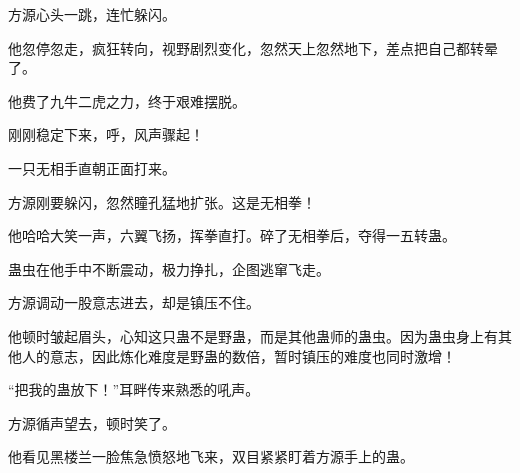 \begin{this_body}
方源心头一跳，连忙躲闪。

他忽停忽走，疯狂转向，视野剧烈变化，忽然天上忽然地下，差点把自己都转晕了。

他费了九牛二虎之力，终于艰难摆脱。

刚刚稳定下来，呼，风声骤起！

一只无相手直朝正面打来。

方源刚要躲闪，忽然瞳孔猛地扩张。这是无相拳！

他哈哈大笑一声，六翼飞扬，挥拳直打。碎了无相拳后，夺得一五转蛊。

蛊虫在他手中不断震动，极力挣扎，企图逃窜飞走。

方源调动一股意志进去，却是镇压不住。

他顿时皱起眉头，心知这只蛊不是野蛊，而是其他蛊师的蛊虫。因为蛊虫身上有其他人的意志，因此炼化难度是野蛊的数倍，暂时镇压的难度也同时激增！

“把我的蛊放下！”耳畔传来熟悉的吼声。

方源循声望去，顿时笑了。

他看见黑楼兰一脸焦急愤怒地飞来，双目紧紧盯着方源手上的蛊。

\end{this_body}

